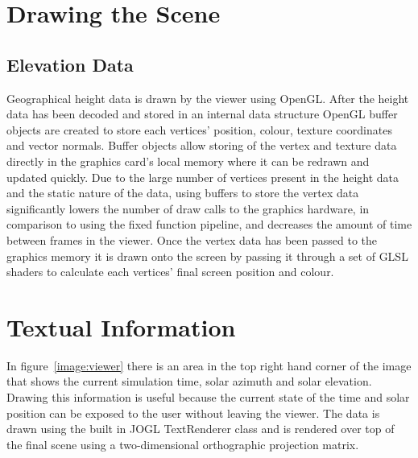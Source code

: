 \documentclass[12pt]{report}
\begin{document}
\section{Drawing the Scene}

\subsection{Elevation Data}
Geographical height data is drawn by the viewer using OpenGL. After the height data has been decoded and stored in an internal data structure OpenGL buffer objects are created to store each vertices' position, colour, texture coordinates and vector normals. Buffer objects allow storing of the vertex and texture data directly in the graphics card's local memory where it can be redrawn and updated quickly. Due to the large number of vertices present in the height data and the static nature of the data, using buffers to store the vertex data significantly lowers the number of draw calls to the graphics hardware, in comparison to using the fixed function pipeline, and decreases the amount of time between frames in the viewer. Once the vertex data has been passed to the graphics memory it is drawn onto the screen by passing it through a set of GLSL shaders to calculate each vertices' final screen position and colour.

\section{Textual Information}
In figure~\ref{image:viewer} there is an area in the top right hand corner of the image that shows the current simulation time, solar azimuth and solar elevation. Drawing this information is useful because the current state of the time and solar position can be exposed to the user without leaving the viewer. The data is drawn using the built in JOGL TextRenderer class and is rendered over top of the final scene using a two-dimensional orthographic projection matrix.
\end{document}

